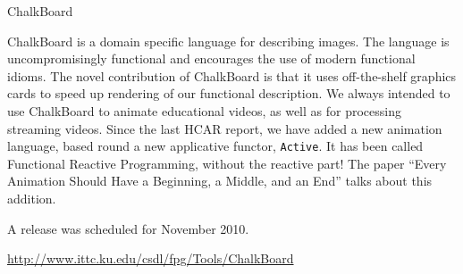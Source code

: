 \begin{hcarentry}{ChalkBoard}
\label{chalkboard}
\makeheader

ChalkBoard is a domain specific language for describing images. 
The language is uncompromisingly functional
and encourages the use of modern functional idioms.
The novel contribution of ChalkBoard is that it uses off-the-shelf
graphics cards to speed up rendering of our functional description.
We always intended to use ChalkBoard to animate educational
videos, as well as for processing streaming videos.
Since the last HCAR report, we have added a new animation language, based round a new applicative
functor, \verb|Active|. It has been called Functional Reactive Programming,
without the reactive part! The paper
``Every Animation Should Have a Beginning, a Middle, and an End'' talks
about this addition. 

A release was scheduled for November 2010.

\FurtherReading
  \url{http://www.ittc.ku.edu/csdl/fpg/Tools/ChalkBoard}
\end{hcarentry}
